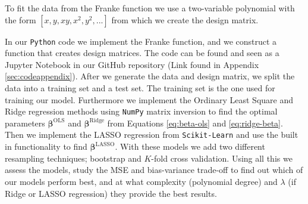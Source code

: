 \documentclass[norsk,a4paper,12pt]{article}
\begin{document}
\begin{multicols}{2}

To fit the data from the Franke function we use a two-variable polynomial with the form $[x, y, xy, x^2, y^2,...]$ from which we create the design matrix. 

In our \texttt{Python} code we implement the Franke function, and we construct a function that creates design matrices. The code can be found and seen as a Jupyter Notebook in our GitHub repository (Link found in Appendix \ref{sec:codeappendix}). After we generate the data and design matrix, we split the data into a training set and a test set. The training set is the one used for training our model. Furthermore we implement the Ordinary Least Square and Ridge regression methods using \texttt{NumPy} matrix inversion to find the optimal parameters $\boldsymbol{\beta}^{\mathrm{OLS}}$ and $\boldsymbol{\beta}^{\mathrm{Ridge}}$ from Equations \ref{eq:beta-ols} and \ref{eq:ridge-beta}. Then we implement the LASSO regression from \texttt{Scikit-Learn} and use the built in functionality to find $\boldsymbol{\beta}^{\mathrm{LASSO}}$. With these models we add two different resampling techniques; bootstrap and $K$-fold cross validation. Using all this we assess the models, study the MSE and bias-variance trade-off to find out which of our models perform best, and at what complexity (polynomial degree) and $\lambda$ (if Ridge or LASSO regression) they provide the best results.



\end{multicols}
\end{document}
